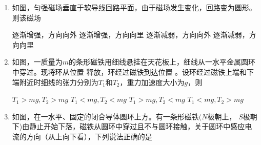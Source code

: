 

\begin{enumerate}
\renewcommand{\labelenumi}{\arabic{enumi}.}
\item
{}
如图，匀强磁场垂直于软导线回路平面，由于磁场发生变化，回路变为圆形。则该磁场  


\begin{minipage}[h!]{0.7\linewidth}
\vspace{0.3em}
\fourchoices
{逐渐增强，方向向外 }
{逐渐增强，方向向里}
{逐渐减弱，方向向外 }
{逐渐减弱，方向向里}
\vspace{0.3em}
\end{minipage}
\hfill
\begin{minipage}[h!]{0.3\linewidth}
\flushright
\vspace{0.3em}

\vspace{0.3em}
\end{minipage}



\item 
{}
如图，一质量为$ m $的条形磁铁用细线悬挂在天花板上，细线从一水平金属圆环中穿过。现将环从位置  释放，环经过磁铁到达位置  。设环经过磁铁上端和下端附近时细线的张力分别为$ T_{1} $和$ T_{2} $，重力加速度大小为$ g $，则  

\begin{minipage}[h!]{0.7\linewidth}
\vspace{0.3em}
\fourchoices
{$ T _ { 1 } > m g , T _ { 2 } > m g $}
{$ T _ { 1 } < m g , T _ { 2 } < m g $}
{$ T _ { 1 } > m g , T _ { 2 } < m g $}
{$ T _ { 1 } < m g , T _ { 2 } > m g $}

\vspace{0.3em}
\end{minipage}
\hfill
\begin{minipage}[h!]{0.3\linewidth}
\flushright
\vspace{0.3em}

\vspace{0.3em}
\end{minipage}

\item 
{}
如图，在一水平、固定的闭合导体圆环上方。有一条形磁铁$ (N $极朝上， $ S $极朝下)由静止开始下落，磁铁从圆环中穿过且不与圆环接触，关于圆环中感应电流的方向（从上向下看），下列说法正确的是  



\end{enumerate}
